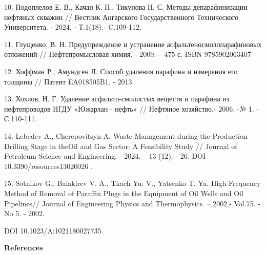 \begin{refs}
10. Подоплелов Е. В., Качан К. П., Тикунова Н. С. Методы депарафинизации
нефтяных скважин // Вестник Ангарского Государственного Технического
Университета. - 2024. - Т.1(18).- C.109-112.

11. Глущенко, В. Н. Предупреждение и устранение
асфальтеносмолопарафиновых отложений // Нефтепромысловая химия. - 2009.
-- 475 с. ISBN 9785902063407

12. Хоффман Р., Амундсен Л. Способ удаления парафина и измерения его
толщины // Патент EA018505B1. - 2013.

13. Хохлов, Н. Г. Удаление асфальто-смолистых веществ и парафина из
нефтепроводов НГДУ «Южарлан - нефть» // Нефтяное хозяйство.- 2006. -№ 1.
- С.110-111.

14. Lebedev A., Cherepovitsyn A. Waste Management during the Production
Drilling Stage in theOil and Gas Sector: A Feasibility Study // Journal
of Petroleum Science and Engineering. - 2024. -- 13 (12). - 26. DOI
10.3390/resources13020026 .

15. Sotnikov G., Balakirev V. A., Tkach Yu. V., Yatsenko T. Yu.
High-Frequency Method of Removal of Paraffin Plugs in the Equipment of
Oil Wells and Oil Pipelines// Journal of Engineering Physics and
Thermophysics. -- 2002.- Vol.75. - No 5. - 2002.

DOI 10.1023/A:1021180027735.
\end{refs}

\begin{center}
{\bfseries References}
\end{center}

